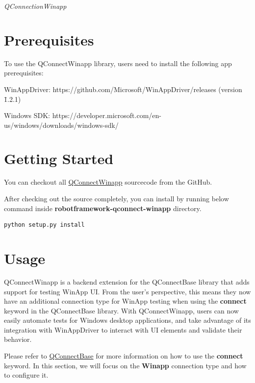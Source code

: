 %
%

\emph{QConnectionWinapp}

\hypertarget{prerequisites}{%
\section{Prerequisites}\label{prerequisites}}
To use the QConnectWinapp library, users need to install the following app prerequisites:

WinAppDriver: https://github.com/Microsoft/WinAppDriver/releases (version \>\=1.2.1)

Windows SDK: https://developer.microsoft.com/en-us/windows/downloads/windows-sdk/

\hypertarget{getting-started}{%
\section{Getting Started}\label{getting-started}}

You can checkout all
\href{https://github.com/test-fullautomation/robotframework-qconnect-winapp/}{QConnectWinapp}
sourcecode from the GitHub.

After checking out the source completely, you can install by running
below command inside \textbf{robotframework-qconnect-winapp} directory.

\begin{verbatim}
python setup.py install
\end{verbatim}

\hypertarget{usage}{%
\section{Usage}\label{usage}}

QConnectWinapp is a backend extension for the QConnectBase library that adds support for testing WinApp UI.
From the user's perspective, this means they now have an additional connection type for WinApp testing when using the \textbf{connect} keyword in the QConnectBase library.
With QConnectWinapp, users can now easily automate tests for Windows desktop applications, and take advantage of its integration with WinAppDriver to interact with UI elements and validate their behavior.

Please refer to \href{https://github.com/test-fullautomation/robotframework-qconnect-base/blob/develop/QConnectBase/QConnectBase.pdf}{QConnectBase} for more information on how to use the \textbf{connect} keyword.
In this section, we will focus on the \textbf{Winapp} connection type and how to configure it.

